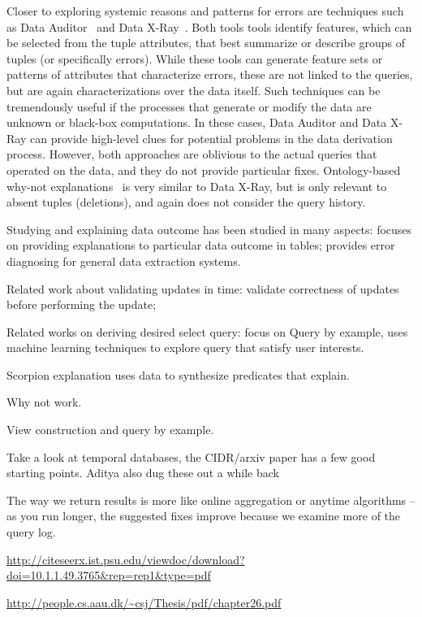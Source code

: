 Closer to exploring systemic reasons and patterns for errors are
techniques such as Data Auditor~\cite{Golab2008, GolabKKS10} and Data
X-Ray~\cite{wang2015}. Both tools tools identify features, which can
be selected from the tuple attributes, that best summarize or describe
groups of tuples (or specifically errors). While these tools can
generate feature sets or patterns of attributes that characterize
errors, these are not linked to the queries, but are again
characterizations over the data itself. Such techniques can be
tremendously useful if the processes that generate or modify the data
are unknown or black-box computations. In these cases, Data Auditor
and Data X-Ray can provide high-level clues for potential problems in
the data derivation process. However, both approaches are oblivious to
the actual queries that operated on the data, and they do not provide
particular fixes. Ontology-based why-not
explanations~\cite{tenCate2015} is very similar to Data X-Ray, but is
only relevant to absent tuples (deletions), and again does not
consider the query history.





\cite{Golab2008,GolabKKS10 } 

Studying and explaining
data outcome has been studied in many aspects:
\cite{GebalyAGKS14}
focuses on providing 
explanations to particular data outcome in tables; \cite{wang2015}
provides error diagnosing for general data extraction systems. 


Related work about validating updates in time: 
\cite{Chen2011} validate correctness of updates before performing the update;


Related works on deriving desired select query: focus on 
Query by example, \cite{dimitriadou2014explore}  uses machine learning
techniques to explore query that satisfy user interests. 


\cite{mucslu2013data}



Scorpion explanation uses data to synthesize predicates that explain.

Why not work.

View construction and query by example.

Take a look at temporal databases, the CIDR/arxiv paper has a few good starting points. Aditya also dug these out a while back


The way we return results is more like online aggregation or anytime algorithms -- 
as you run longer, the suggested fixes improve because we examine more of the query log.

\url{http://citeseerx.ist.psu.edu/viewdoc/download?doi=10.1.1.49.3765&rep=rep1&type=pdf}

\url{http://people.cs.aau.dk/~csj/Thesis/pdf/chapter26.pdf}
